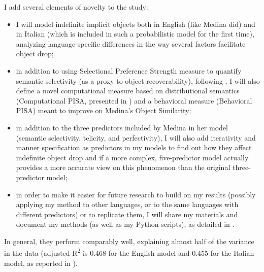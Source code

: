 I add several elements of novelty to the study:
\begin{itemize}
    \item I will model indefinite implicit objects both in English (like Medina did) and in Italian (which is included in such a probabilistic model for the first time), analyzing language-specific differences in the way several factors facilitate object drop;
    \item in addition to using  Selectional Preference Strength measure to quantify semantic selectivity (as a proxy to object recoverability), following \textcite{Medina2007}, I will also define a novel computational measure based on distributional semantics (Computational PISA, presented in \textcite{CappelliLenciPISA}) and a behavioral measure (Behavioral PISA) meant to improve on Medina's Object Similarity;
    \item in addition to the three predictors included by Medina in her model (semantic selectivity, telicity, and perfectivity), I will also add iterativity and manner specification as predictors in my models to find out how they affect indefinite object drop and if a more complex, five-predictor model actually provides a more accurate view on this phenomenon than the original three-predictor model;
    \item in order to make it easier for future research to build on my results (possibly applying my method to other languages, or to the same languages with different predictors) or to replicate them, I will share my materials and document my methods (as well as my Python scripts), as detailed in .
\end{itemize}

In general, they perform comparably well, explaining almost half of the variance in the data (adjusted R\textsuperscript{2} is 0.468 for the English model and 0.455 for the Italian model, as reported in ).

